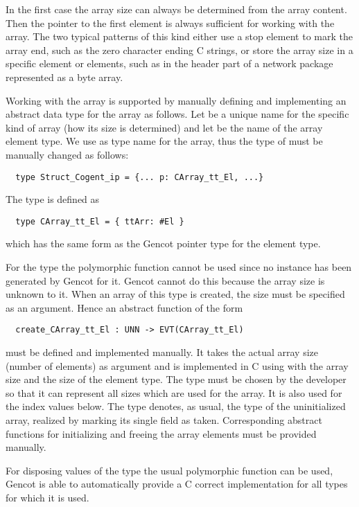 In the first case the array size can always be determined from the array content. Then the pointer to the first 
element is always sufficient for working with the array. The two typical patterns of this kind either use a 
stop element to mark the array end, such as the zero character ending C strings, or store the array size in a
specific element or elements, such as in the header part of a network package represented as a byte array.

Working with the array is supported by manually defining and implementing an abstract data type for the array as follows.
Let  be a unique name for the specific kind of array (how its size is determined) and let  be the
name of the array element type. We use  as type name for the array, thus the 
type of  must be manually changed as follows:
\begin{verbatim}
  type Struct_Cogent_ip = {... p: CArray_tt_El, ...}
\end{verbatim}

The type  is defined as
\begin{verbatim}
  type CArray_tt_El = { ttArr: #El }
\end{verbatim}
which has the same form as the Gencot pointer type for the element type.

For the type  the polymorphic function  cannot be used since no instance has been
generated by Gencot for it. Gencot cannot do this because the array size is unknown to it. When an array 
of this type is created, the size must be specified as an argument. Hence an abstract function of the form
\begin{verbatim}
  create_CArray_tt_El : UNN -> EVT(CArray_tt_El)
\end{verbatim}
must be defined and implemented manually. It takes the actual array size (number of elements) as argument and is
implemented in C using  with the array size and the size of the element type. The type  must be
chosen by the developer so that it can represent all sizes which are used for the array. It is also used for the index
values below. The type  denotes, as usual, the type of the uninitialized array, realized
by marking its single field  as taken. Corresponding abstract functions 
for initializing and freeing the array elements must be provided manually.

For disposing values of the type  the usual polymorphic function  can be used, 
Gencot is able to automatically provide a C correct implementation for all types for which it is used.

